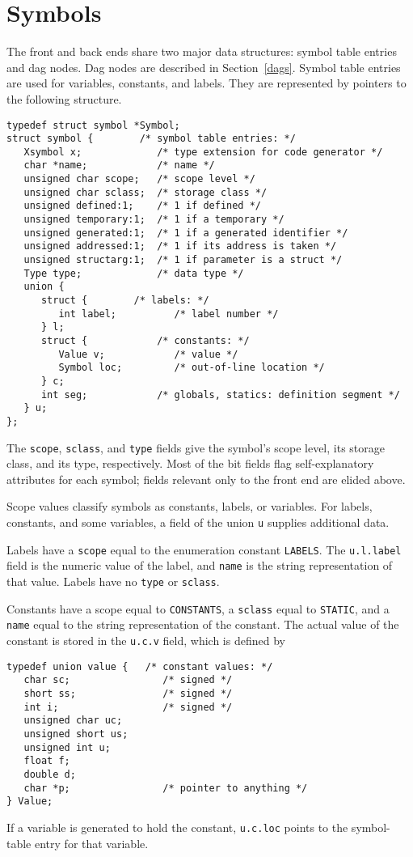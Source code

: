 \section{Symbols}

\label{symbols}
The front and back ends share two major data structures: symbol table
entries and dag nodes. Dag nodes are described in Section~\ref{dags}.
Symbol table entries are used for variables, constants, and labels.
They are represented by pointers to the following structure.
\begin{verbatim}
typedef struct symbol *Symbol;
struct symbol {        /* symbol table entries: */
   Xsymbol x;             /* type extension for code generator */
   char *name;            /* name */
   unsigned char scope;   /* scope level */
   unsigned char sclass;  /* storage class */
   unsigned defined:1;    /* 1 if defined */
   unsigned temporary:1;  /* 1 if a temporary */
   unsigned generated:1;  /* 1 if a generated identifier */
   unsigned addressed:1;  /* 1 if its address is taken */
   unsigned structarg:1;  /* 1 if parameter is a struct */
   Type type;             /* data type */
   union {
      struct {		  /* labels: */
         int label;          /* label number */
      } l;
      struct {            /* constants: */
         Value v;            /* value */
         Symbol loc;         /* out-of-line location */
      } c;
      int seg;            /* globals, statics: definition segment */
   } u;
};
\end{verbatim}
The \verb|scope|, \verb|sclass|, and \verb|type| fields give the symbol's
scope level, its storage class, and its type, respectively.
Most of the bit fields flag self-explanatory attributes for each symbol;
fields relevant only to the front end are elided above.

Scope values classify symbols as constants, labels, or variables.
For labels, constants, and some variables,
a field of the union \verb|u| supplies additional data.

Labels have a \verb|scope| equal to the enumeration constant \verb|LABELS|.
The \verb|u.l.label| field is the numeric value of the label,
and \verb|name| is the string representation of that value.
Labels have no \verb|type| or \verb|sclass|.

Constants have a scope equal to \verb|CONSTANTS|, a \verb|sclass| equal
to \verb|STATIC|, and a \verb|name|
equal to the string representation of the constant.
The actual value of the constant is stored in the \verb|u.c.v| field,
which is defined by
\begin{verbatim}
typedef union value {   /* constant values: */
   char sc;                /* signed */
   short ss;               /* signed */
   int i;                  /* signed */
   unsigned char uc;
   unsigned short us;
   unsigned int u;
   float f;
   double d;
   char *p;                /* pointer to anything */
} Value;
\end{verbatim}
If a variable is generated to hold the constant,
\verb|u.c.loc| points to the symbol-table entry for that variable.

